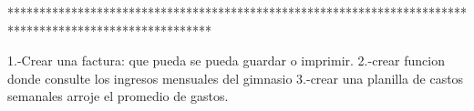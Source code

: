 
********************************************************************************************************

1.-Crear una factura: que pueda se pueda guardar o imprimir.
2.-crear funcion donde consulte los ingresos mensuales del gimnasio
3.-crear una planilla de castos semanales arroje el promedio de gastos.